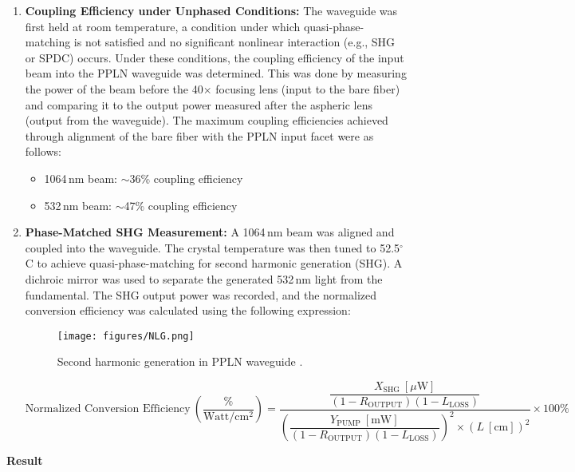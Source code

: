 \documentclass[colorlinks=true,pdfstartview=FitV,linkcolor=blue,
citecolor=red,urlcolor=magenta]{ligodoc}
\begin{document}
\begin{enumerate}
    \item \textbf{Coupling Efficiency under Unphased Conditions:}  
    The waveguide was first held at room temperature, a condition under which quasi-phase-matching is not satisfied and no significant nonlinear interaction (e.g., SHG or SPDC) occurs. Under these conditions, the coupling efficiency of the input beam into the PPLN waveguide was determined. This was done by measuring the power of the beam before the 40$\times$ focusing lens (input to the bare fiber) and comparing it to the output power measured after the aspheric lens (output from the waveguide). The maximum coupling efficiencies achieved through alignment of the bare fiber with the PPLN input facet were as follows:
    \begin{itemize}
        \item 1064\,nm beam: $\sim$36\% coupling efficiency
        \item 532\,nm beam: $\sim$47\% coupling efficiency
    \end{itemize}
    
    \item \textbf{Phase-Matched SHG Measurement:}  
    A 1064\,nm beam was aligned and coupled into the waveguide. The crystal temperature was then tuned to 52.5$^\circ$C to achieve quasi-phase-matching for second harmonic generation (SHG). A dichroic mirror was used to separate the generated 532\,nm light from the fundamental. The SHG output power was recorded, and the normalized conversion efficiency was calculated using the following expression:
    
    \begin{figure}[H]
        \centering
        \texttt{[image: figures/NLG.png]}
        \caption{Second harmonic generation in PPLN waveguide \cite{manual}.}
        \label{fig:enter-label}
    \end{figure}
    
    \[
    \text{Normalized Conversion Efficiency}~\left(\frac{\%}{\text{Watt}/\text{cm}^2}\right) = 
    \frac{
        \dfrac{X_{\text{SHG}}~[\mu\text{W}]}{(1 - R_{\text{OUTPUT}})(1 - L_{\text{LOSS}})}
    }{
        \left( \dfrac{Y_{\text{PUMP}}~[\text{mW}]}{(1 - R_{\text{OUTPUT}})(1 - L_{\text{LOSS}})} \right)^2 \times (L~[\text{cm}])^2
    }
    \times 100\%
    \]
    
\end{enumerate}

\textbf{Result}
\end{document}
